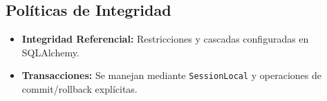 \subsection{Políticas de Integridad}
\begin{itemize}
    \item \textbf{Integridad Referencial:} Restricciones y cascadas configuradas en SQLAlchemy.
    \item \textbf{Transacciones:} Se manejan mediante \texttt{SessionLocal} y operaciones de commit/rollback explícitas.
\end{itemize}
